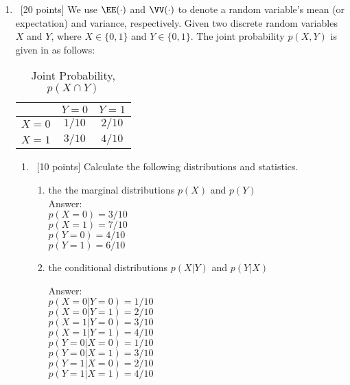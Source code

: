 \documentclass[12pt, fullpage,letterpaper]{article}
\begin{document}
\begin{enumerate}
\item~[20 points]  We use $\EE(\cdot)$ and $\VV(\cdot)$ to denote a random variable's mean (or expectation) and variance, respectively. Given two discrete random variables $X$ and $Y$, where $X \in \{0, 1\}$ and $Y \in \{0,1\}$. The joint probability $p(X,Y)$ is given in as follows:
\begin{table}[h]
        \centering
        \begin{tabular}{ccc}
        \hline\hline
         & $Y=0$ & $Y=1$ \\ \hline
         $X=0$ & $1/10$ & $2/10$ \\ \hline
         $X=1$  & $3/10$ & $4/10$ \\ \hline\hline
        \end{tabular}
        \caption{Joint Probability, ${ p(X \cap Y)}$ }
\end{table}
	
        \begin{enumerate}
            \item~[10 points] Calculate the following distributions and statistics. 
            \begin{enumerate}
            \item the the marginal distributions $p(X)$ and $p(Y)$ \\
            Answer: \\

$p(X=0) = 3/10$ \\ 
$p(X=1) = 7/10$ \\ 
$p(Y=0) = 4/10$ \\ 
$p(Y=1) = 6/10$ \\ 



            \item the conditional distributions $p(X|Y)$ and $p(Y|X)$
            
            Answer: \\
$p(X=0|Y=0) = 1/10$ \\            
$p(X=0|Y=1) = 2/10$  \\           
$p(X=1|Y=0) = 3/10$ \\            
$p(X=1|Y=1) = 4/10$  \\   
$p(Y=0|X=0) = 1/10$ \\            
$p(Y=0|X=1) = 3/10$ \\            
$p(Y=1|X=0) = 2/10$ \\            
$p(Y=1|X=1) = 4/10$ \\            


\end{enumerate}
\end{enumerate}
\end{enumerate}
\end{document}
